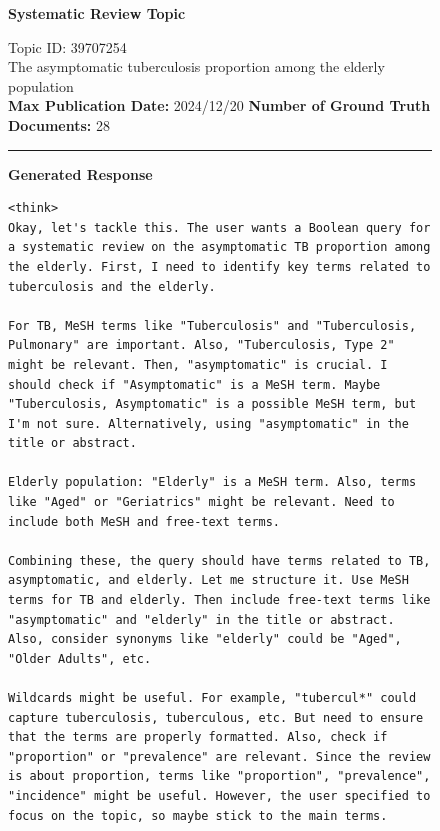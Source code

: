 \begin{figure}[p]
	\centering
	
	\begin{CombinedBox}
		\textbf{\small Systematic Review Topic}
		
		\vspace{0.3em}
		{\footnotesize
			Topic ID: 39707254 \\ The asymptomatic tuberculosis proportion among the elderly population
			\\
			\textbf{Max Publication Date:} 2024/12/20 \quad \textbf{Number of Ground Truth Documents:} 28
		}
		
		\vspace{0.5em}
		\hrule
		\vspace{0.5em}
		
		\textbf{\small Generated Response}
		
		\vspace{0.3em}
		\begin{lstlisting}[basicstyle=\ttfamily\scriptsize, breaklines=true, breakatwhitespace=true, showstringspaces=false, columns=fullflexible, keepspaces=true, breakindent=0pt, frame=none, xleftmargin=0pt, xrightmargin=0pt]
<think>
Okay, let's tackle this. The user wants a Boolean query for a systematic review on the asymptomatic TB proportion among the elderly. First, I need to identify key terms related to tuberculosis and the elderly. 

For TB, MeSH terms like "Tuberculosis" and "Tuberculosis, Pulmonary" are important. Also, "Tuberculosis, Type 2" might be relevant. Then, "asymptomatic" is crucial. I should check if "Asymptomatic" is a MeSH term. Maybe "Tuberculosis, Asymptomatic" is a possible MeSH term, but I'm not sure. Alternatively, using "asymptomatic" in the title or abstract.

Elderly population: "Elderly" is a MeSH term. Also, terms like "Aged" or "Geriatrics" might be relevant. Need to include both MeSH and free-text terms. 

Combining these, the query should have terms related to TB, asymptomatic, and elderly. Let me structure it. Use MeSH terms for TB and elderly. Then include free-text terms like "asymptomatic" and "elderly" in the title or abstract. Also, consider synonyms like "elderly" could be "Aged", "Older Adults", etc. 

Wildcards might be useful. For example, "tubercul*" could capture tuberculosis, tuberculous, etc. But need to ensure that the terms are properly formatted. Also, check if "proportion" or "prevalence" are relevant. Since the review is about proportion, terms like "proportion", "prevalence", "incidence" might be useful. However, the user specified to focus on the topic, so maybe stick to the main terms.


\end{lstlisting}
\end{CombinedBox}
\end{figure}
